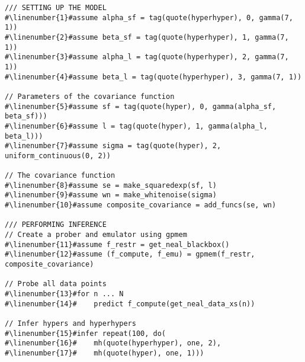\begin{mdframed}
\begin{minipage}{\linewidth}
\belowcaptionskip=-10pt
\small
\begin{lstlisting}[mathescape,label=alg:gphierarch,basicstyle=\selectfont\ttfamily,numbers=none,caption={Hyper-Prior Learning},escapechar=\#]
/// SETTING UP THE MODEL
#\linenumber{1}#assume alpha_sf = tag(quote(hyperhyper), 0, gamma(7, 1))
#\linenumber{2}#assume beta_sf = tag(quote(hyperhyper), 1, gamma(7, 1))
#\linenumber{3}#assume alpha_l = tag(quote(hyperhyper), 2, gamma(7, 1))
#\linenumber{4}#assume beta_l = tag(quote(hyperhyper), 3, gamma(7, 1))

// Parameters of the covariance function
#\linenumber{5}#assume sf = tag(quote(hyper), 0, gamma(alpha_sf, beta_sf)))
#\linenumber{6}#assume l = tag(quote(hyper), 1, gamma(alpha_l, beta_l)))
#\linenumber{7}#assume sigma = tag(quote(hyper), 2, uniform_continuous(0, 2)) 

// The covariance function
#\linenumber{8}#assume se = make_squaredexp(sf, l)
#\linenumber{9}#assume wn = make_whitenoise(sigma)
#\linenumber{10}#assume composite_covariance = add_funcs(se, wn)

/// PERFORMING INFERENCE
// Create a prober and emulator using gpmem
#\linenumber{11}#assume f_restr = get_neal_blackbox()
#\linenumber{12}#assume (f_compute, f_emu) = gpmem(f_restr, composite_covariance)

// Probe all data points
#\linenumber{13}#for n ... N
#\linenumber{14}#    predict f_compute(get_neal_data_xs(n))

// Infer hypers and hyperhypers
#\linenumber{15}#infer repeat(100, do(
#\linenumber{16}#    mh(quote(hyperhyper), one, 2),
#\linenumber{17}#    mh(quote(hyper), one, 1)))

\end{lstlisting}
\end{minipage}
\end{mdframed}
